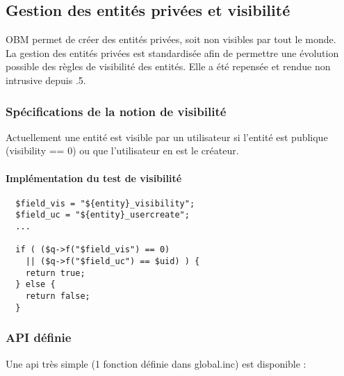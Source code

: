 

\subsection{Gestion des entités privées et visibilité}

OBM permet de créer des entités privées, soit non visibles par tout le monde.\\

La gestion des entités privées est standardisée afin de permettre une évolution possible des règles de visibilité des entités.
Elle a été repensée et rendue non intrusive depuis .5.

\subsubsection{Spécifications de la notion de visibilité}

Actuellement une entité est visible par un utilisateur si l'entité est publique (visibility == 0) ou que l'utilisateur en est le créateur.\\

\paragraph{Implémentation du test de visibilité}
\begin{verbatim}
  $field_vis = "${entity}_visibility";
  $field_uc = "${entity}_usercreate";
  ...

  if ( ($q->f("$field_vis") == 0)
    || ($q->f("$field_uc") == $uid) ) {
    return true;
  } else {
    return false;
  }
\end{verbatim}


\subsubsection{API définie}

Une api très simple (1 fonction définie dans global.inc) est disponible :\\

